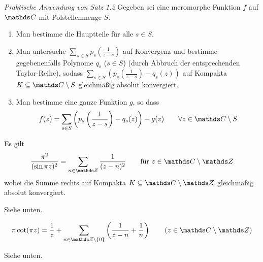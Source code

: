 \emph{Praktische Anwendung von Satz 1.2} Gegeben sei eine meromorphe Funktion $f$ auf $\CC$ mit Polstellenmenge $S$.
\begin{enumerate}
\item Man bestimme die Hauptteile für alle $s\in S$.
\item Man untersuche $\sum _{s\in S} p_s(\frac{1}{z-s})$ auf Konvergenz und bestimme gegebenenfalls Polynome $q_s$ ($s\in S$) (durch Abbruch der entsprechenden Taylor-Reihe), sodass $\sum _{s\in S} (p_s(\frac{1}{z-s})-q_s(z))$ auf Kompakta $K \subseteq \CC\setminus S$ gleichmäßig absolut konvergiert.
\item Man bestimme eine ganze Funktion $g$, so dass
\[
	f(z) = \sum_{s\in S} \left(p_s\left(\frac{1}{z-s}\right)-q_s(z)\right) + g(z) \qquad \forall z\in \CC\setminus S
\]
\end{enumerate}

\begin{bsp-list}\label{bsp:partialbruch_cot}
\item Es gilt
\begin{equation}\label{eqn:bsp1.3.i}
	\frac{\pi^2}{(\sin \pi z)^2} = \sum _ {n \in \ZZ} \frac{1}{(z-n)^2} \qquad \text{für } z\in \CC\setminus\ZZ
\end{equation}
wobei die Summe rechts auf Kompakta $K \subseteq \CC\setminus\ZZ$ gleichmäßig absolut konvergiert.
\begin{bewe}
Siehe unten.
\end{bewe}

\item {}
\begin{equation}\label{eqn:bsp1.3.ii}
	\pi\cot(\pi z)
	= \frac{1}{z} + \sum _{n \in \ZZ\setminus\{0\}} \left( \frac{1}{z-n} + \frac{1}{n}\right)
	\qquad (z \in \CC\setminus\ZZ)
\end{equation}

\begin{bewe}
Siehe unten.
\end{bewe}
\end{bsp-list}

